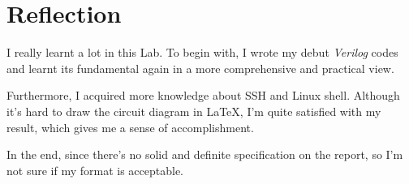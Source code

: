 \documentclass[12pt, a4paper]{article}
\begin{document}
\section{Reflection}

I really learnt a lot in this Lab. To begin with, I wrote my debut \textit{Verilog} codes and learnt its fundamental again in a more comprehensive and practical view.

Furthermore, I acquired more knowledge about SSH and Linux shell. Although it's hard to draw the circuit diagram in \LaTeX, I'm quite satisfied with my result, which gives me a sense of accomplishment.

In the end, since there's no solid and definite specification on the report, so I'm not sure if my format is acceptable.
\end{document}
